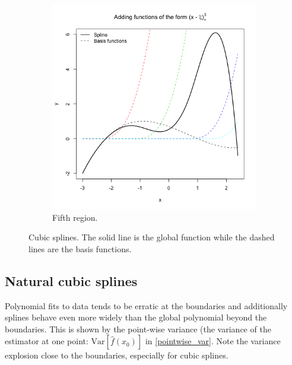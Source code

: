 \documentclass[12pt, letterpaper]{article}
\theoremstyle{definition}
\newcommand{\Var}{\mathrm{Var}}
\begin{document}
\begin{figure}\ContinuedFloat
\begin{subfigure}{0.49\textwidth}
\centering
\includegraphics[width=1\linewidth]{img/spline_cubic/100}
\caption{Fifth region.}
\end{subfigure}
\label{spline_cubic}
\caption{Cubic splines. The solid line is the global function while the dashed lines are the basis functions.}
\end{figure}

\subsection{Natural cubic splines}
Polynomial fits to data tends to be erratic at the boundaries and additionally splines behave even more widely than the global polynomial beyond the boundaries. This is shown by the point-wise variance (the variance of the estimator at one point: $\Var[\hat{f}(x_0)]$ in \autoref{pointwise_var}. Note the variance explosion close to the boundaries, especially for cubic splines.
\end{document}
